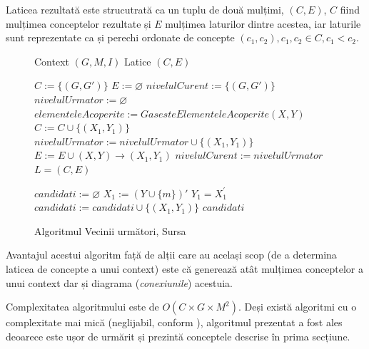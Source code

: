 \documentclass[12pt, a4paper, twoside, romanian]{teza-upb}
\begin{document}
    Laticea rezultată este strucutrată ca un tuplu de două mulțimi, $(C, E)$, $C$ fiind mulțimea conceptelor rezultate și $E$ mulțimea laturilor dintre acestea, iar laturile sunt reprezentate ca și perechi ordonate de concepte $(c_1, c_2), c_1, c_2 \in C, c_1 < c_2$.

    \begin{figure}[h!]
      \begin{algorithmic}[1]
        \Require Context $(G, M, I)$
        \Ensure Latice $(C, E)$

          \State $C := \{(G, G')\}$
          \State $E := \varnothing$
          \State $nivelulCurent := \{(G, G')\}$
            \State $nivelulUrmator := \varnothing$
              \State $elementeleAcoperite  := GasesteElementeleAcoperite(X, Y)$
                  \State $C := C \cup \{(X_1, Y_1)\}$
                  \State $nivelulUrmator := nivelulUrmator \cup \{ (X_1, Y_1) \}$
                \EndIf
                \State $E := E \cup (X, Y) \rightarrow (X_1, Y_1)$
              \EndFor
            \EndFor
            \State $nivelulCurent := nivelulUrmator$
          \EndWhile
          \State \Return $L = (C, E)$
        \EndFunction
        
          \State $candidati := \varnothing$
            \State $X_1 := (Y \cup \{m\})'$
            \State $Y_1 = X_{1}^{'}$
            \State $candidati := candidati \cup \{(X_1, Y_1)\}$
            \EndIf
          \EndFor
          \State \Return $candidati$
        \EndFunction
      \end{algorithmic}
      \caption{Algoritmul Vecinii următori, Sursa \cite{Carpineto:2004:CDA:975252}}
      \label{figure:next-neighbors-algorithm}
    \end{figure}

    Avantajul acestui algoritm față de alții care au același scop (de a determina laticea de concepte a unui context) este că generează atât mulțimea conceptelor a unui context  dar și diagrama (\textit{conexiunile}) acestuia.

    Complexitatea algoritmului este de $O(C \times G \times M^2)$. Deși există algoritmi cu o complexitate mai mică (neglijabil, conform \cite{Carpineto:2004:CDA:975252}), algoritmul prezentat a fost ales deoarece este ușor de urmărit și prezintă conceptele descrise în prima secțiune.
\end{document}
